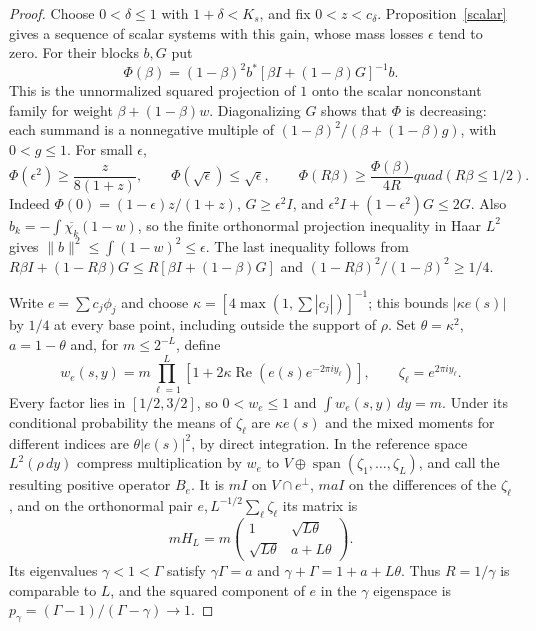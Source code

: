 \documentclass[reqno,a4paper,12pt]{amsart}
\newcommand{\spn}{\operatorname{span}}
\begin{document}
\begin{proof}
Choose $0<\delta\le1$ with $1+\delta<K_s$, and fix $0<z<c_\delta$.
Proposition~\ref{scalar} gives a sequence of scalar systems with this
gain, whose mass losses $\epsilon$ tend to zero. For their blocks $b,G$ put
\[
 \Phi(\beta)=(1-\beta)^2b^*[\beta I+(1-\beta)G]^{-1}b.
\]
This is the unnormalized squared projection of $1$ onto the scalar
nonconstant family for weight $\beta+(1-\beta)w$.
Diagonalizing $G$ shows that $\Phi$ is decreasing: each summand is
a nonnegative multiple of $(1-\beta)^2/(\beta+(1-\beta)g)$, with
$0<g\le1$. For small $\epsilon$,
\begin{equation}\label{responsebounds}
 \Phi(\epsilon^2)\ge\frac{z}{8(1+z)},\qquad
 \Phi(\sqrt\epsilon)\le\sqrt\epsilon,\qquad
 \Phi(R\beta)\ge\frac{\Phi(\beta)}{4R}quad(R\beta\le1/2).
\end{equation}
Indeed $\Phi(0)=(1-\epsilon)z/(1+z)$,
$G\ge\epsilon^2I$, and
$\epsilon^2I+(1-\epsilon^2)G\le2G$.
Also $b_k=-\int\overline{\chi_k}(1-w)$, so the finite orthonormal
projection inequality in Haar $L^2$ gives $\|b\|^2\le\int(1-w)^2\le\epsilon$.
The last inequality follows from
$R\beta I+(1-R\beta)G\le R[\beta I+(1-\beta)G]$ and
$(1-R\beta)^2/(1-\beta)^2\ge1/4$.

Write $e=\sum c_j\phi_j$ and choose
$\kappa=[4\max(1,\sum|c_j|)]^{-1}$; this bounds $|\kappa e(s)|$ by
$1/4$ at every base point, including outside the support of $\rho$.
Set $\theta=\kappa^2$, $a=1-\theta$ and, for $m\le2^{-L}$, define
\[
 w_e(s,y)=m\prod_{\ell=1}^L
 [1+2\kappa\operatorname{Re}(e(s)e^{-2\pi iy_\ell})],
 \qquad \zeta_\ell=e^{2\pi iy_\ell}.
\]
Every factor lies in $[1/2,3/2]$, so $0<w_e\le1$ and
$\int w_e(s,y)\,dy=m$.
Under its conditional probability the means of $\zeta_\ell$ are
$\kappa e(s)$ and the mixed moments for different indices are
$\theta|e(s)|^2$, by direct integration.
In the reference space $L^2(\rho\,dy)$ compress multiplication by $w_e$
to $V\oplus\spn(\zeta_1,\ldots,\zeta_L)$, and call the resulting
positive operator $B_e$. It is $mI$ on $V\cap e^\perp$, $maI$ on
the differences of the $\zeta_\ell$, and on the orthonormal pair
$e,L^{-1/2}\sum_\ell\zeta_\ell$ its matrix is
\[
 mH_L=m\begin{pmatrix}1&\sqrt{L\theta}\\
 \sqrt{L\theta}&a+L\theta\end{pmatrix}.
\]
Its eigenvalues $\gamma<1<\Gamma$ satisfy $\gamma\Gamma=a$ and
$\gamma+\Gamma=1+a+L\theta$. Thus $R=1/\gamma$ is comparable to $L$,
and the squared component of $e$ in the $\gamma$ eigenspace is
$p_\gamma=(\Gamma-1)/(\Gamma-\gamma)\to1$.


\end{proof}
\end{document}

